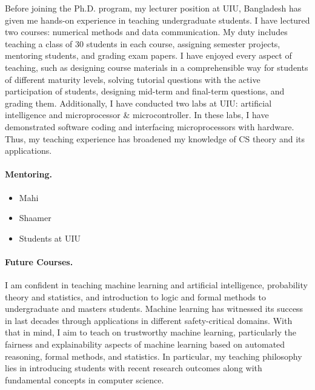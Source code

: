 \documentclass[11pt]{article}
\begin{document}
		
		Before joining the Ph.D. program, my lecturer position at UIU, Bangladesh has given me hands-on experience in teaching undergraduate students. I have lectured two courses: numerical methods and data communication. My duty includes teaching a class of 30 students in each course, assigning semester projects, mentoring students, and grading exam papers.  I have enjoyed every aspect of teaching, such as designing course materials in a comprehensible way for students of different maturity levels, solving tutorial questions with the active participation of students, designing mid-term and final-term questions, and grading them. Additionally, I have conducted two labs at UIU: artificial intelligence and microprocessor \& microcontroller. In these labs, I have demonstrated software coding and interfacing microprocessors with hardware. Thus, my teaching experience has broadened my knowledge of CS theory and its applications. 
		
		
	\paragraph{Mentoring.}
	
		\begin{itemize}
			\item Mahi
			\item Shaamer
			\item Students at UIU
		\end{itemize}

	
	\paragraph{Future Courses.}
	
		I am confident in teaching machine learning and artificial intelligence, probability theory and statistics, and introduction to logic and formal methods to undergraduate and masters students. Machine learning has witnessed its success in last decades through applications in different safety-critical domains. With that in mind, I aim to teach on trustworthy machine learning, particularly the fairness and explainability aspects of machine learning based on automated reasoning, formal methods, and statistics. In particular, my teaching philosophy lies in introducing students with recent research outcomes along with fundamental concepts in computer science.
		
		
\end{document}
